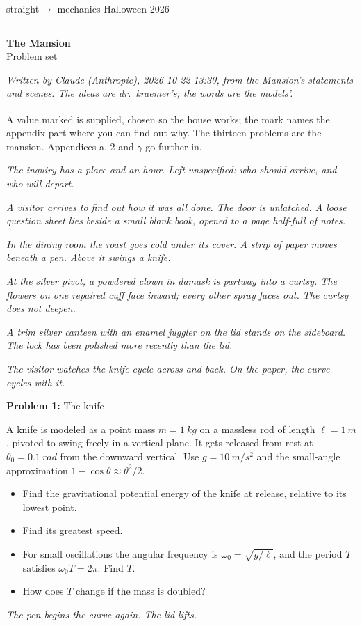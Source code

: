 \documentclass[11pt]{article}
\newcommand{\room}[1]{\par\bigskip{\large\bfseries #1}\par\nopagebreak\smallskip}
\newcommand{\scene}[1]{\par{\itshape #1}\par}
\newcommand{\problem}[2]{\par\medskip\textbf{Problem #1:} #2\par\nopagebreak}
\newenvironment{parts}{\begin{itemize}[leftmargin=3.4em,labelwidth=2.8em,labelsep=0.6em,align=left,itemsep=2pt,topsep=3pt]}{\end{itemize}}
\newcommand{\pt}[1]{\item[\textbf{#1}]}
\begin{document}
\thispagestyle{plain}
\noindent straight$\to$ mechanics \hfill Halloween 2026\par
\vspace{-6pt}\rule{\textwidth}{0.4pt}
\begin{center}
{\LARGE\bfseries The Mansion}\\[4pt]
{\large Problem set}
\end{center}

\textit{Written by Claude (Anthropic), 2026-10-22 13:30, from the Mansion's statements and scenes. The ideas are dr.\ kraemer's; the words are the models'.}

A value marked \textsuperscript{\dag} is supplied, chosen so the house works; the mark names the appendix part where you can find out why. The thirteen problems are the mansion. Appendices a, 2 and $\gamma$ go further in.

\room{The way in}
\scene{The inquiry has a place and an hour. Left unspecified: who should arrive, and who will depart.}
\scene{A visitor arrives to find out how it was all done. The door is unlatched. A loose question sheet lies beside a small blank book, opened to a page half-full of notes.}
\scene{In the dining room the roast goes cold under its cover. A strip of paper moves beneath a pen. Above it swings a knife.}
\scene{At the silver pivot, a powdered clown in damask is partway into a curtsy. The flowers on one repaired cuff face inward; every other spray faces out. The curtsy does not deepen.}
\scene{A trim silver canteen with an enamel juggler on the lid stands on the sideboard. The lock has been polished more recently than the lid.}
\scene{The visitor watches the knife cycle across and back. On the paper, the curve cycles with it.}

\room{Dining room}
\problem{1}{The knife}
A knife is modeled as a point mass $m = \SI{1}{kg}$ on a massless rod of length $\ell = \SI{1}{m}$, pivoted to swing freely in a vertical plane. It gets released from rest at $\theta_0 = \SI{0.1}{rad}$ from the downward vertical. Use $g = \SI{10}{m/s^2}$ and the small-angle approximation $1 - \cos\theta \approx \theta^2/2$.
\begin{parts}
\pt{1-a} Find the gravitational potential energy of the knife at release, relative to its lowest point.
\pt{1-b} Find its greatest speed.
\pt{1-c} For small oscillations the angular frequency is $\omega_0 = \sqrt{g/\ell}$, and the period $T$ satisfies $\omega_0 T = 2\pi$. Find $T$.
\pt{1-d} How does $T$ change if the mass is doubled?
\end{parts}
\scene{The pen begins the curve again. The lid lifts.}
\end{document}
